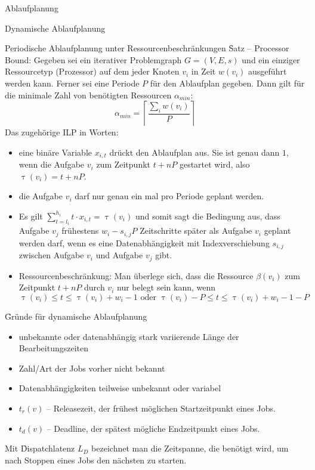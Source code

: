 \begin{chapter}{Ablaufplanung}
\begin{section}{Dynamische Ablaufplanung}
\begin{subsection}{Periodische Ablaufplanung unter Ressourcenbeschränkungen}
    \f{Satz -- Processor Bound:} Gegeben sei ein iterativer Problemgraph $G = (V,E,s)$ und ein einziger Ressourcetyp (Prozessor) auf dem jeder Knoten $v_i$ in Zeit $w(v_i)$ ausgeführt werden kann. Ferner sei eine Periode $P$ für den Ablaufplan gegeben. Dann gilt für die minimale Zahl von benötigten Ressourcen $\alpha_{min}$:
    \[ \alpha_{min} = \left\lceil \frac{\sum_i w(v_i)}{P} \right\rceil \]
    Das zugehörige ILP in Worten:
    \begin{itemize}
     \item eine binäre Variable $x_{i,t}$ drückt den Ablaufplan aus. Sie ist genau dann $1$, wenn die Aufgabe $v_i$ zum Zeitpunkt $t+nP$ gestartet wird, also $\uptau (v_i) = t+nP$.
     \item die Aufgabe $v_i$ darf nur genau ein mal pro Periode geplant werden.
     \item Es gilt $ \sum_{t=l_i}^{h_i} t\cdot x_{i,t} = \uptau(v_i) $ und somit sagt die Bedingung aus, dass Aufgabe $v_j$ frühestens $w_i - s_{i,j} P$ Zeitschritte später als Aufgabe $v_i$ geplant werden darf, wenn es eine Datenabhängigkeit mit Indexverschiebung $s_{i,j}$ zwischen Aufgabe $v_i$ und Aufgabe $v_j$ gibt.
     \item Ressourcenbeschränkung: Man überlege sich, dass die Ressource $\beta(v_i)$ zum Zeitpunkt $t + nP$ durch $v_i$ nur belegt sein kann, wenn
     \[ \uptau(v_i) \leq t \leq \uptau(v_i) + w_i -1 \text{ oder } \uptau(v_i)-P \leq t \leq \uptau(v_i) + w_i -1 -P \]
    \end{itemize}
   \end{subsection}
   
   \f{Gründe für dynamische Ablaufplanung}
   \begin{itemize}
    \item unbekannte oder datenabhängig stark variierende Länge der Bearbeitungszeiten
    \item Zahl/Art der Jobs vorher nicht bekannt
    \item Datenabhängigkeiten teilweise unbekannt oder variabel
   \end{itemize}
   
   \begin{itemize}
    \item $t_r(v)$ -- Releasezeit, der frühest möglichen Startzeitpunkt eines Jobs. 
    \item $t_d(v)$ -- Deadline, der spätest mögliche Endzeitpunkt eines Jobs.
   \end{itemize}
   
   Mit \f{Dispatchlatenz} $L_D$ bezeichnet man die Zeitspanne, die benötigt wird, um nach Stoppen eines Jobs den nächsten zu starten. 
   

\end{section}
\end{chapter}
